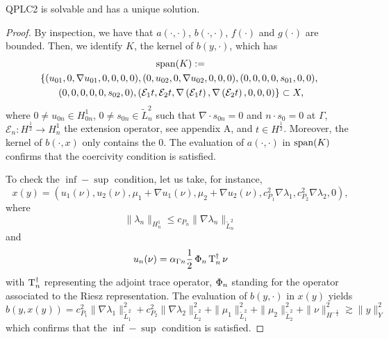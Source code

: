 \begin{proposition}
QPLC2 is solvable and has a unique solution.
\end{proposition}

\begin{proof}
By inspection, we have that $a(\cdot, \cdot)$, $b(\cdot, \cdot)$, $f(\cdot)$ and $g(\cdot)$ are bounded. 
Then, we identify $K$, the kernel of $b(y, \cdot)$, which has
\begin{multline}
\operatorname{span}(K) :=\\
            \left \{ (          u_{01},               0,                     \nabla u_{01},                                  0,      0,      0, 0),
                     (               0,          u_{02},                                 0,                      \nabla u_{02},      0,      0, 0),
                     (               0,               0,                                 0,                                  0, s_{01},      0, 0),\right.\\
               \left.(               0,               0,                                 0,                                  0,      0, s_{02}, 0),
                     ( \mathcal{E}_1 t, \mathcal{E}_2 t,\nabla\left(\mathcal{E}_1 t\right), \nabla\left(\mathcal{E}_2 t\right),      0,      0, 0)\right \} \subset X,
\end{multline}
where $0 \neq u_{0n} \in H^1_{0n}$, $0 \neq s_{0n} \in \tilde{L}^2_n$ such that $\nabla \cdot s_{0n} = 0$ and $n\cdot s_0 = 0$ at $\Gamma$, $\mathcal{E}_n : H^\frac12 \to H^1_n$ the extension operator, see appendix A, and $t \in H^\frac12$. Moreover, the kernel of $b(\cdot, x)$ only contains the $0$. The evaluation of $a(\cdot,\cdot)$ in $\operatorname{span}(K)$ confirms that the coercivity condition is satisfied.

To check the $\inf-\sup$ condition, let us take, for instance,
\begin{equation}
x(y) = \left(u_1(\nu), u_2(\nu), \mu_1+\nabla u_1(\nu), \mu_2+\nabla u_2(\nu),
c_{P_1}^2\nabla \lambda_1, c_{P_2}^2\nabla \lambda_2, 0\right),    
\end{equation}
where
\begin{equation}\|\lambda_n\|_{H^1_n} \leq c_{P_n} \|\nabla \lambda_n\|_{\tilde{L}^2_n}
\end{equation}
and
\begin{equation}
    u_n(\nu) = \alpha_{\Gamma n}\frac12 \operatorname{\Phi}_n \operatorname{T}^\dagger_n \nu
\end{equation}
with $\operatorname{T}^\dagger_n$ representing the adjoint trace operator, $\operatorname{\Phi}_n$ standing for the operator associated to the Riesz representation.
The evaluation of $b(y, \cdot)$ in $x(y)$ yields
\begin{equation}
b(y, x(y)) = 
c_{P_1}^2\|\nabla \lambda_1\|^2_{\tilde{L}^2_1}+
c_{P_2}^2\|\nabla \lambda_2\|^2_{\tilde{L}^2_2}+
\|\mu_1\|^2_{\tilde{L}^2_1}+\|\mu_2\|^2_{\tilde{L}^2_2}+\|\nu\|^2_{H^{-\frac12}} \gtrsim \|y\|^2_{Y}  
\end{equation}
which confirms that the $\inf-\sup$ condition is satisfied.
\end{proof}

